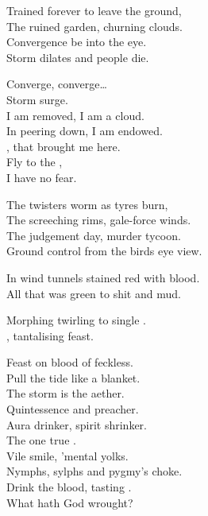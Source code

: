 
Trained forever to leave the ground, \\
The ruined garden, churning clouds. \\
Convergence be into the eye. \\
Storm dilates and people die. \\


Converge, converge… \\
Storm surge. \\

I am removed, I am a cloud. \\
In peering down, I am endowed. \\
, that brought me here. \\
Fly to the , \\
I have no fear. \\


The twisters worm as tyres burn, \\
The screeching rims, gale-force winds. \\
The judgement day, murder tycoon. \\
Ground control from the birds eye view. \\


In wind tunnels stained red with blood. \\
All that was green to shit and mud. \\


Morphing twirling to single . \\
, tantalising feast. \\


Feast on blood of feckless. \\
Pull the tide like a blanket. \\

The storm is the aether. \\
Quintessence and preacher. \\
Aura drinker, spirit shrinker. \\
The one true . \\
Vile smile, 'mental yolks. \\
Nymphs, sylphs and pygmy's choke. \\
Drink the blood, tasting . \\
What hath God wrought? \\

